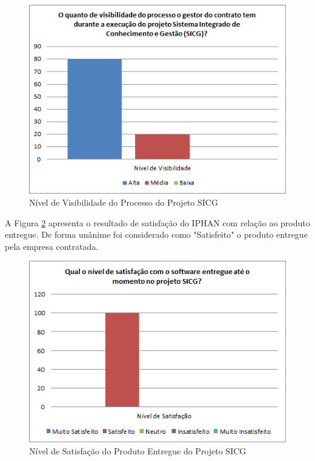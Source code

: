 \begin{figure}[H]
		\centering
			\includegraphics[scale=1.0]{figuras/visibilidade.png}
		\caption{Nível de Visibilidade do Processo do Projeto SICG}
		\label{visibilidade}
\end{figure}

A Figura \ref{satisfacao} apresenta o resultado de satisfação do IPHAN com relação ao produto entregue. De forma unânime foi considerado como "Satisfeito" o produto entregue pela empresa contratada. 

\begin{figure}[H]
		\centering
			\includegraphics[scale=1.0]{figuras/satisfacao.png}
		\caption{Nível de Satisfação do Produto Entregue do Projeto SICG}
		\label{satisfacao}
\end{figure}

